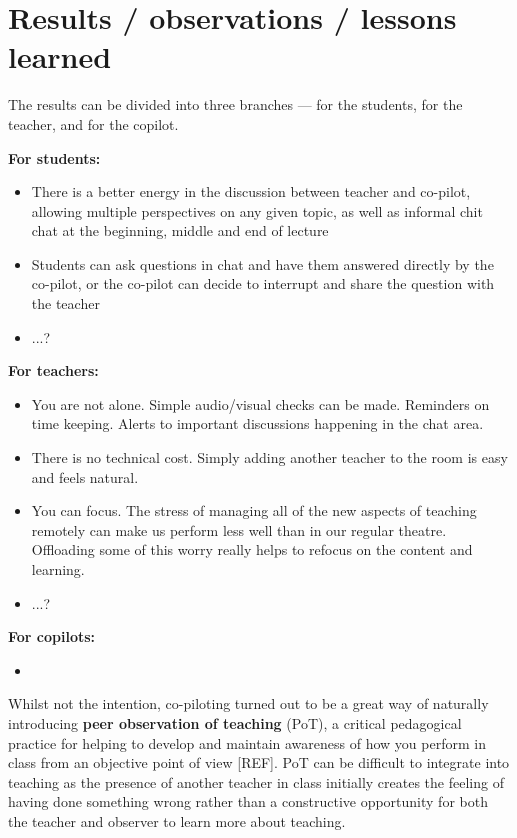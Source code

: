 \documentclass{article}
\begin{document}
\section*{Results / observations / lessons learned}

The results can be divided into three branches --- for the students, for the 
teacher, and for the copilot.

\textbf{For students:}
\begin{itemize}
  \item There is a better energy in the discussion between teacher and co-pilot, allowing multiple perspectives on any given topic, as well as informal chit chat at the beginning, middle and end of lecture
  \item Students can ask questions in chat and have them answered directly by the co-pilot, or the co-pilot can decide to interrupt and share the question with the teacher
  \item ...?
\end{itemize}

\textbf{For teachers:}
\begin{itemize}
  \item You are not alone. Simple audio/visual checks can be made. Reminders on time keeping. Alerts to important discussions happening in the chat area.
  \item There is no technical cost. Simply adding another teacher to the room is easy and feels natural.
  \item You can focus. The stress of managing all of the new aspects of teaching remotely can make us perform less well than in our regular theatre. Offloading some of this worry really helps to refocus on the content and learning.
  \item ...?
\end{itemize}

\textbf{For copilots:}
\begin{itemize}
  \item
\end{itemize}

Whilst not the intention, co-piloting turned out to be a great way of naturally introducing \textbf{peer observation of teaching} (PoT), a critical pedagogical practice for helping to develop and maintain awareness of how you perform in class from an objective point of view [REF]. PoT can be difficult to integrate into teaching as the presence of another teacher in class initially creates the feeling of having done something wrong rather than a constructive opportunity for both the teacher and observer to learn more about teaching.
\end{document}
